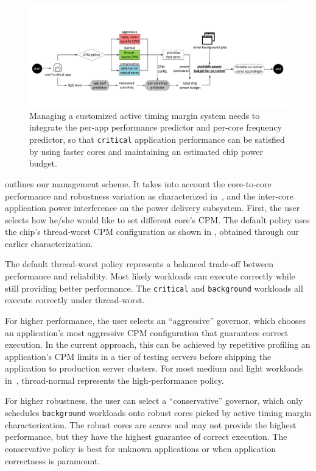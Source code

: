 \begin{figure}
  \centering
  \includegraphics[trim=10 90 10 150,clip,width=\linewidth]{graphs/process//schedule-flow/schedule-flow.pdf}
  \caption{Managing a customized active timing margin system needs to integrate the per-app performance predictor and per-core frequency predictor, so that \texttt{critical} application performance can be satisfied by using faster cores and maintaining an estimated chip power budget.}
  \label{fig:schedule-flow}
\end{figure}

 outlines our management scheme. It takes into account the core-to-core performance and robustness variation as characterized in~, and the inter-core application power interference on the power delivery subsystem. First, the user selects how he/she would like to set different core's CPM. The default policy uses the chip's thread-worst CPM configuration as shown in , obtained through our earlier characterization.

The default thread-worst policy represents a balanced trade-off between performance and reliability. Most likely workloads can execute correctly while still providing better performance. The \texttt{critical} and \texttt{background} workloads all execute correctly under thread-worst.

For higher performance, the user selects an ``aggressive'' governor, which chooses an application's most aggressive CPM configuration that guarantees correct execution. In the current approach, this can be achieved by repetitive profiling an application's CPM limits in a tier of testing servers before shipping the application to production server clusters. For most medium and light workloads in~, thread-normal represents the high-performance policy.

For higher robustness, the user can select a ``conservative'' governor, which only schedules \texttt{background} workloads onto robust cores picked by active timing margin characterization. The robust cores are scarce and may not provide the highest performance, but they have the highest guarantee of correct execution. The conservative policy is best for unknown applications or when application correctness is paramount.

